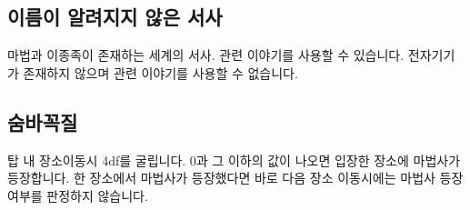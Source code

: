 \documentclass{report}
\begin{document}
	\subsection*{이름이 알려지지 않은 서사}
		마법과 이종족이 존재하는 세계의 서사. 관련 이야기를 사용할 수 있습니다. 전자기기가 존재하지 않으며 관련 이야기를 사용할 수 없습니다.
		
	\subsection*{숨바꼭질}
		탑 내 장소이동시 4df를 굴립니다. 0과 그 이하의 값이 나오면 입장한 장소에 마법사가 등장합니다. 한 장소에서 마법사가 등장했다면 바로 다음 장소 이동시에는 마법사 등장 여부를 판정하지 않습니다.
\end{document}
